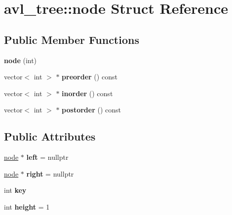 \hypertarget{structavl__tree_1_1node}{\section{avl\-\_\-tree\-:\-:node Struct Reference}
\label{structavl__tree_1_1node}
}
\subsection*{Public Member Functions}
\begin{DoxyCompactItemize}
\item 
\hypertarget{structavl__tree_1_1node_a94e7fa472a575bbcae1e506c4c8b3534}{{\bfseries node} (int)}\label{structavl__tree_1_1node_a94e7fa472a575bbcae1e506c4c8b3534}

\item 
\hypertarget{structavl__tree_1_1node_a6932b4c28a69e1adc86f41f74e16cd6e}{vector$<$ int $>$ $\ast$ {\bfseries preorder} () const }\label{structavl__tree_1_1node_a6932b4c28a69e1adc86f41f74e16cd6e}

\item 
\hypertarget{structavl__tree_1_1node_ac0a51c1a20c50c9c4e0d7037e28afbc2}{vector$<$ int $>$ $\ast$ {\bfseries inorder} () const }\label{structavl__tree_1_1node_ac0a51c1a20c50c9c4e0d7037e28afbc2}

\item 
\hypertarget{structavl__tree_1_1node_abe9f3981d8b35f0816657345eeada0a2}{vector$<$ int $>$ $\ast$ {\bfseries postorder} () const }\label{structavl__tree_1_1node_abe9f3981d8b35f0816657345eeada0a2}

\end{DoxyCompactItemize}
\subsection*{Public Attributes}
\begin{DoxyCompactItemize}
\item 
\hypertarget{structavl__tree_1_1node_a3e7851f7104dd71af924b27e70d80f3a}{\hyperlink{structavl__tree_1_1node}{node} $\ast$ {\bfseries left} = nullptr}\label{structavl__tree_1_1node_a3e7851f7104dd71af924b27e70d80f3a}

\item 
\hypertarget{structavl__tree_1_1node_aff21ea47ae19da99113bd7900fb69785}{\hyperlink{structavl__tree_1_1node}{node} $\ast$ {\bfseries right} = nullptr}\label{structavl__tree_1_1node_aff21ea47ae19da99113bd7900fb69785}

\item 
\hypertarget{structavl__tree_1_1node_a07b67fe6e79e2272835dd6485272b823}{int {\bfseries key}}\label{structavl__tree_1_1node_a07b67fe6e79e2272835dd6485272b823}

\item 
\hypertarget{structavl__tree_1_1node_a57a93259cb3f71b15fe737a559d8f0cc}{int {\bfseries height} = 1}\label{structavl__tree_1_1node_a57a93259cb3f71b15fe737a559d8f0cc}

\end{DoxyCompactItemize}


